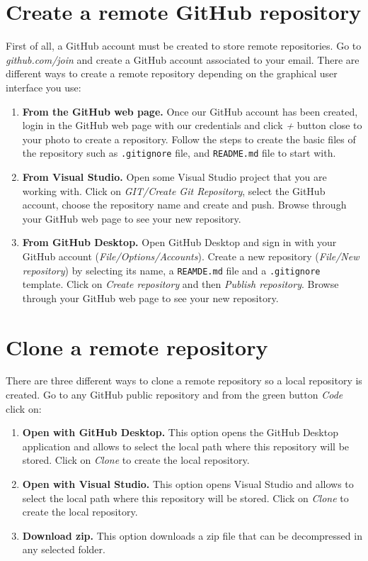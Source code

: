 
\section{Create a remote  GitHub repository}
 
 First of all, a GitHub account must be created to store remote repositories. 
 Go to \textit{github.com/join} and create a GitHub account associated to your email.
 There are different ways to create a remote repository depending on the graphical user 
 interface you use: 
   
 \begin{enumerate}
 \item {\bf From the GitHub web page.} Once our GitHub account has been created, login in the GitHub web page 
 with our credentials and click \textit{+} button close to your photo to create a repository. 
 Follow the steps to create the basic files of the repository such as \texttt{.gitignore} file,  
 and \texttt{README.md} file to start with. 
   
 \item {\bf From Visual Studio. } 
 Open some Visual Studio project that you are working with. 
Click on \textit{GIT/Create Git Repository}, 
 select the GitHub account, choose the repository name and create and push.
Browse through your  GitHub web page to see your new repository. 
 
 \item {\bf From GitHub Desktop. }
  Open GitHub Desktop and sign in with your GitHub account 
  (\textit{File/Options/Accounts}).  
  Create a new repository (\textit{File/New repository}) by selecting its name, 
  a \texttt{REAMDE.md} file and a \texttt{.gitignore} template. 
  Click on \textit{Create repository} and then \textit{Publish repository}.
  Browse through your GitHub web page to see your new repository.
  \end{enumerate} 



\section{Clone a remote repository}

There are three different ways to clone a remote repository 
so a local repository is created. 
Go to any GitHub public repository and from the green button  \textit{Code}
click on: 
 \begin{enumerate}
 \item {\bf  Open with GitHub Desktop.}
 This option opens the GitHub Desktop application and allows to select the  
 local path where this repository will be stored. 
  Click on \textit{Clone} to create the local repository. 
 \item {\bf  Open with Visual Studio. } 
 This option opens Visual Studio and allows to select the local path where this repository 
  will be stored. Click on \textit{Clone} to create the local repository. 
 \item {\bf Download zip. } 
 This option downloads a zip file that can be decompressed in any selected folder.
  
\end{enumerate} 



